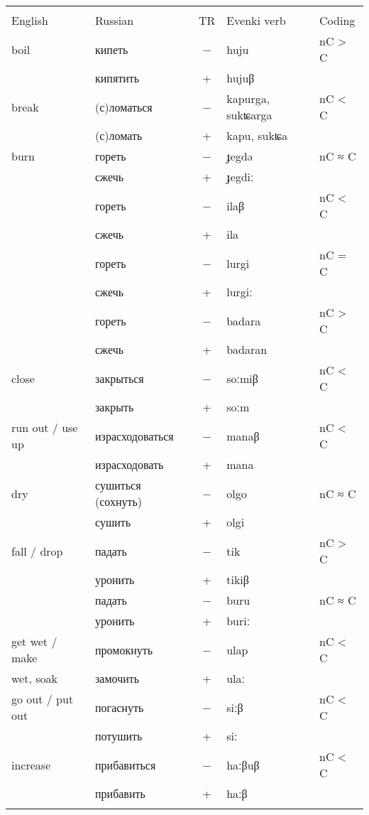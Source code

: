 \documentclass[output=paper,colorlinks,citecolor=brown]{langscibook}
\begin{document}
\begin{paperappendix}
\begin{table}[H]
\begin{tabular}{ l l c l l}
\lsptoprule
\multicolumn{2}{c}{Verb meaning} & \\\cmidrule(lr){1-2}
English  & Russian &	TR &	Evenki verb &	Coding\\
\midrule
boil &	кипеть &	− &	huju &	nC > C\\
 &	кипятить &	+ &	hujuβ &	\\
\midrule
break &	(с)ломаться &	− &	kapurga, sukʨarga &	nC < C\\
 &	(с)ломать &	+ &	kapu, sukʨa &	\\
\midrule
burn &	гореть &	− &	ɟegdə & 	nC ≈ C\\
 &	сжечь &	+ &	ɟegdiː & 	\\
 &	гореть &	− &	ilaβ &	nC < C\\
 &	сжечь &	+ &	ila &	\\
 &	гореть &	− &	lurgi &	nC = C\\
 &	сжечь &	+ &	lurgiː &	\\
 &	гореть &	− &	badara &	nC > C\\
 &	сжечь &	+ &	badaran &	\\
\midrule
close &	закрыться &	− &	soːmiβ &	nC < C\\
 &	закрыть  &	+ &	soːm &	\\
\midrule
run out / use up &	израсходоваться &	− &	manaβ &	nC < C\\
 &	израсходовать &	+ &	mana &	\\
\midrule
dry &	сушиться (сохнуть) &	− &	olgo &	nC ≈ C\\
 &	сушить  &	+ &	olgi	\\
\midrule
fall / drop &	падать &	− &	tik &	nC > C\\
 &	уронить &	+ &	tikiβ & 	\\
 &	падать &	− &	buru &	nC ≈ C\\
 &	уронить &	+ &	buriː &	\\
 \midrule
get wet / make &	промокнуть &	− &	ulap &	nC < C\\
wet, soak &	замочить &	+ &	ulaː &\\
\midrule
go out / put out &	погаснуть &	− &	siːβ &	nC < C\\
 &	потушить &	+ &	siː &	\\
 \midrule
increase &	прибавиться &	− &	haːβuβ &	nC < C\\
 &	прибавить &	+ &	haːβ &	\\
  \lspbottomrule
\end{tabular}
\label{table:2Appendix3a}
\end{table}



\end{paperappendix}
\end{document}
